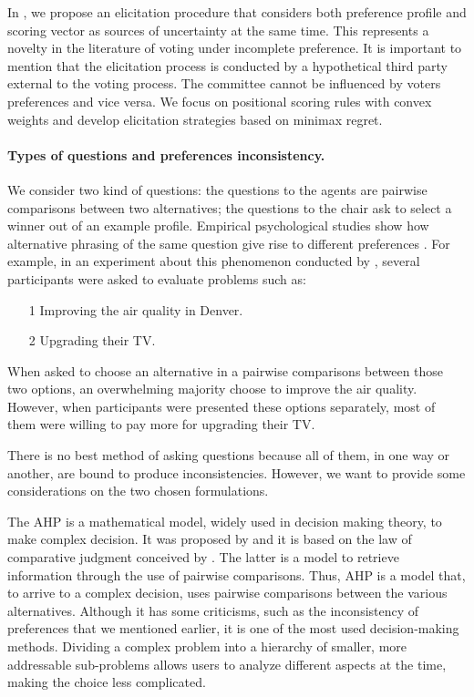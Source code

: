 In , we propose an elicitation procedure that considers both preference profile and scoring vector as sources of uncertainty at the same time. This represents a novelty in the literature of voting under incomplete preference. It is important to mention that the elicitation process is conducted by a hypothetical third party external to the voting process. The committee cannot be influenced by voters preferences and vice versa. 
We focus on positional scoring rules with convex weights and develop elicitation strategies based on minimax regret. 

\paragraph{Types of questions and preferences inconsistency.}
We consider two kind of questions: the questions to the agents are pairwise comparisons between two alternatives; the questions to the chair ask to select a winner out of an example profile.
Empirical psychological studies show how alternative phrasing of the same question give rise to different preferences \citep{Tversky1986}. 
For example, in an experiment about this phenomenon conducted by \citet{Irwin1993}, several participants were asked to evaluate problems such as:
\begin{itemize}[nosep]
	\item[1] Improving the air quality in Denver.
	\item[2] Upgrading their TV.
\end{itemize}
When asked to choose an alternative in a pairwise comparisons between those two options, an overwhelming majority choose to improve the air quality. However, when participants were presented these options separately, most of them were willing to pay more for upgrading their TV.

There is no best method of asking questions because all of them, in one way or another, are bound to produce inconsistencies. However, we want to provide some considerations on the two chosen formulations.

The \ac{AHP} is a mathematical model, widely used in decision making theory, to make complex decision. It was proposed by \citet{Saaty1986} and it is based on the law of comparative judgment conceived by \citet{Thurstone1927}. The latter is a model to retrieve information through the use of pairwise comparisons. Thus, \ac{AHP} is a model that, to arrive to a complex decision, uses pairwise comparisons between the various alternatives.
Although it has some criticisms, such as the inconsistency of preferences that we mentioned earlier, it is one of the most used decision-making methods. Dividing a complex problem into a hierarchy of smaller, more addressable sub-problems allows users to analyze different aspects at the time, making the choice less complicated.

